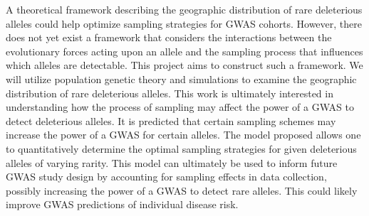 A theoretical framework describing the geographic distribution of rare deleterious alleles could help optimize sampling strategies for GWAS cohorts. However, there does not yet exist a framework that considers the interactions between the evolutionary forces acting upon an allele and the sampling process that influences which alleles are detectable. This project aims to construct such a framework. We will utilize population genetic theory and simulations to examine the geographic distribution of rare deleterious alleles. This work is ultimately interested in understanding how the process of sampling may affect the power of a GWAS to detect deleterious alleles. It is predicted that certain sampling schemes may increase the power of a GWAS for certain alleles. The model proposed allows one to quantitatively determine the optimal sampling strategies for given deleterious alleles of varying rarity. This model can ultimately be used to inform future GWAS study design by accounting for sampling effects in data collection, possibly increasing the power of a GWAS to detect rare alleles. This could likely improve GWAS predictions of individual disease risk.